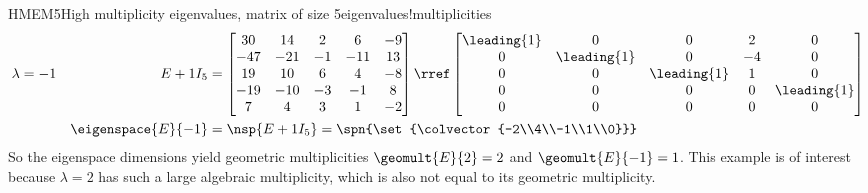 \begin{example}{HMEM5}{High multiplicity eigenvalues, matrix of size 5}{eigenvalues!multiplicities}
\begin{align*}
%
\lambda&=-1&E+1I_5&=
\begin{bmatrix}
30 & 14 & 2 & 6 & -9\\
-47 & -21 & -1 & -11 & 13\\
19 & 10 & 6 & 4 & -8\\
-19 & -10 & -3 & -1 & 8\\
7 & 4 & 3 & 1 & -2
\end{bmatrix}
\rref
\begin{bmatrix}
\leading{1} & 0 & 0 & 2 & 0\\
0 & \leading{1} & 0 & -4 & 0\\
0 & 0 & \leading{1} & 1 & 0\\
0 & 0 & 0 & 0 & \leading{1}\\
0 & 0 & 0 & 0 & 0
\end{bmatrix}\\
&&\eigenspace{E}{-1}&=\nsp{E+1I_5}=\spn{\set{\colvector{-2\\4\\-1\\1\\0}}}\\
%
\end{align*}
%
So the eigenspace dimensions yield geometric multiplicities $\geomult{E}{2}=2$ and $\geomult{E}{-1}=1$.  This example is of interest because $\lambda=2$ has such a large algebraic multiplicity, which is also not equal to its geometric multiplicity.
%
\end{example}
%

